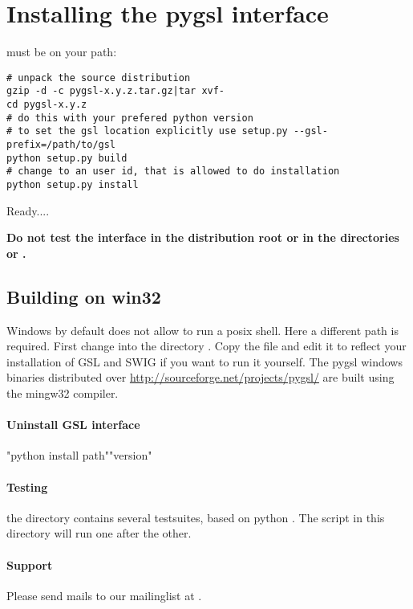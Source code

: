 \section{Installing the pygsl interface}

 must be on your path:\nopagebreak
\begin{verbatim}
# unpack the source distribution
gzip -d -c pygsl-x.y.z.tar.gz|tar xvf-
cd pygsl-x.y.z
# do this with your prefered python version
# to set the gsl location explicitly use setup.py --gsl-prefix=/path/to/gsl
python setup.py build
# change to an user id, that is allowed to do installation
python setup.py install
\end{verbatim}
Ready....

{\bf Do not test the interface in the distribution root or in the directories
  or .}

\subsection{Building on win32}

Windows by default does not allow to run a posix shell. Here a different path
is required. First change into the directory . Copy the file 
and edit it to reflect your installation of GSL and SWIG if you want to run it
yourself. The pygsl windows binaries distributed over 
\url{http://sourceforge.net/projects/pygsl/} are built using the mingw32 
compiler. 

\paragraph*{Uninstall GSL interface}
"python install path""version"

\paragraph*{Testing}
the directory  contains several testsuites, based on python
.
The script  in this directory will run one after the other.

\paragraph*{Support}
Please send mails to our mailinglist at
.


